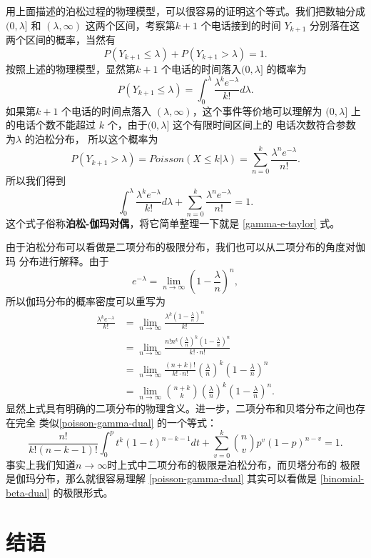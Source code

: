 {用上面描述的泊松过程的物理模型，可以很容易的证明这个等式。我们把数轴分成
$(0, \lambda]$ 和 $(\lambda, \infty)$ 这两个区间，考察第$k+1$ 个电话接到的时间
$Y_{k+1}$ 分别落在这两个区间的概率，当然有
$$ P(Y_{k+1} \le \lambda) + P(Y_{k+1} > \lambda)  = 1 .$$
按照上述的物理模型，显然第$k+1$ 个电话的时间落入$(0, \lambda]$ 的概率为
$$ P(Y_{k+1} \le \lambda) = \int_0^\lambda \frac{\lambda^k e^{-\lambda}}{k!}  d \lambda .$$
如果第$k+1$ 个电话的时间点落入 $(\lambda, \infty)$，这个事件等价地可以理解为 $(0,
\lambda]$ 上的电话个数不能超过 $k$ 个，由于$(0, \lambda]$ 这个有限时间区间上的
电话次数符合参数为$\lambda$ 的泊松分布， 所以这个概率为
$$  P(Y_{k+1} > \lambda) = Poisson(X \le k|\lambda) = \sum_{n=0}^k \frac{\lambda^n e^{-\lambda} }{n!} .$$
所以我们得到
\begin{equation}
\label{poisson-gamma-dual}
\int_0^\lambda \frac{\lambda^k e^{-\lambda}}{k!}d\lambda 
+ \sum_{n=0}^k \frac{\lambda^n e^{-\lambda}}{n!} = 1 .
\end{equation}
这个式子俗称{\bf 泊松-伽玛对偶}，将它简单整理一下就是 \eqref{gamma-e-taylor} 式。

由于泊松分布可以看做是二项分布的极限分布，我们也可以从二项分布的角度对伽玛
分布进行解释。由于 
$$ e^{-\lambda} = \lim_{n\rightarrow \infty} (1- \frac{\lambda}{n}) ^n ,$$
所以伽玛分布的概率密度可以重写为
\begin{align*}
\frac{\lambda^k e^{-\lambda}}{k!} 
& = \lim_{n\rightarrow \infty} \frac{\lambda^k (1-\frac{\lambda}{n}) ^n}{k!}  \\
& = \lim_{n\rightarrow \infty} \frac{ n! n^k (\frac{\lambda}{n})^k (1-\frac{\lambda}{n}) ^n}{k! \cdot n!} \\
& = \lim_{n\rightarrow \infty} \frac{(n+k)!}{k!\cdot n!} (\frac{\lambda}{n})^k (1-\frac{\lambda}{n}) ^n  \\
& = \lim_{n\rightarrow \infty} \binom{n+k}{k} (\frac{\lambda}{n})^k (1-\frac{\lambda}{n}) ^n  .
\end{align*}
显然上式具有明确的二项分布的物理含义。进一步，二项分布和贝塔分布之间也存在完全
类似\eqref{poisson-gamma-dual} 的一个等式：
\begin{equation}
\label{binomial-beta-dual}
\frac{n!}{k!(n-k-1)!} \int_0^p t^k(1-t)^{n-k-1} dt + \sum_{v=0}^k \binom{n}{v} p^v(1-p)^{n-v} = 1 .
\end{equation}
事实上我们知道$n\rightarrow\infty$时上式中二项分布的极限是泊松分布，而贝塔分布的
极限是伽玛分布，那么就很容易理解 \eqref{poisson-gamma-dual} 其实可以看做是
\eqref{binomial-beta-dual} 的极限形式。 

\section{结语}


}
